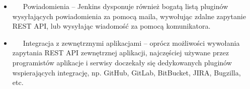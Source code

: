 \documentclass[12pt]{article}
\renewcommand{\_}{\kern-1.5pt\textunderscore\kern-1.5pt}
\begin{document}
\begin{itemize}
	\item \ \ \  Powiadomienia – Jenkins dysponuje również bogatą listą pluginów wysyłających powiadomienia za pomocą maila, wywołując zdalne zapytanie REST API, lub wysyłając wiadomość za pomocą komunikatora.\par

	\item \ \ \  Integracja z zewnętrznymi aplikacjami – oprócz możliwości wywołania zapytania REST API zewnętrznej aplikacji, najczęściej używane przez programistów aplikacje i serwisy doczekały się dedykowanych pluginów wspierających integrację, np. GitHub, GitLab, BitBucket, JIRA, Bugzilla, etc. 
\end{itemize}\par


\printbibliography
\end{document}
